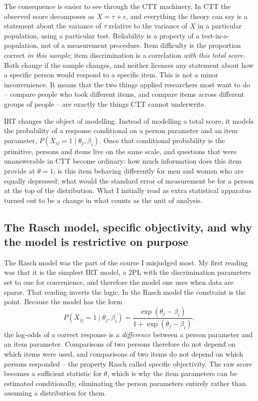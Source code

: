 \documentclass[11pt,a4paper]{article}
\begin{document}
The consequence is easier to see through the CTT machinery. In CTT the observed
score decomposes as $X = \tau + \epsilon$, and everything the theory can say is a
statement about the variance of $\tau$ relative to the variance of $X$ in a
particular population, using a particular test. Reliability is a property of a
test-in-a-population, not of a measurement procedure. Item difficulty is the
proportion correct \emph{in this sample}; item discrimination is a correlation
\emph{with this total score}. Both change if the sample changes, and neither
licenses any statement about how a specific person would respond to a specific
item. This is not a minor inconvenience. It means that the two things applied
researchers most want to do -- compare people who took different items, and
compare items across different groups of people -- are exactly the things CTT
cannot underwrite.

IRT changes the object of modelling. Instead of modelling a total score, it models
the probability of a response conditional on a person parameter and an item
parameter, $P(X_{ij}=1 \mid \theta_j, \beta_i)$. Once that conditional probability
is the primitive, persons and items live on the same scale, and questions that were
unanswerable in CTT become ordinary: how much information does this item provide
at $\theta = 1$; is this item behaving differently for men and women who are
equally depressed; what would the standard error of measurement be for a person
at the top of the distribution. What I initially read as extra statistical
apparatus turned out to be a change in what counts as the unit of analysis.

\subsection{The Rasch model, specific objectivity, and why the model is restrictive
on purpose}

The Rasch model \citep{rasch1960probabilistic} was the part of the course I misjudged most. My first reading was
that it is the simplest IRT model, a 2PL with the discrimination parameters set
to one for convenience, and therefore the model one uses when data are sparse.
That reading inverts the logic. In the Rasch model the constraint is the point.
Because the model has the form
\begin{equation}
P(X_{ij}=1\mid\theta_j,\beta_i)=\frac{\exp(\theta_j-\beta_i)}{1+\exp(\theta_j-\beta_i)},
\end{equation}
the log-odds of a correct response is a \emph{difference} between a person
parameter and an item parameter. Comparisons of two persons therefore do not
depend on which items were used, and comparisons of two items do not depend on
which persons responded -- the property Rasch called specific objectivity. The
raw score becomes a sufficient statistic for $\theta$, which is why the item
parameters can be estimated conditionally, eliminating the person parameters
entirely rather than assuming a distribution for them.
\end{document}
